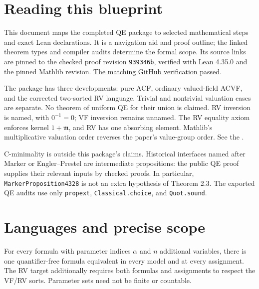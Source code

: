 \section{Reading this blueprint}
This document maps the completed QE package to selected mathematical steps
and exact Lean declarations. It is a navigation aid and proof outline;
the linked theorem types and compiler audits determine the formal scope.
Its source links are pinned to the checked proof revision
\texttt{939346b}, verified with Lean 4.35.0 and the pinned Mathlib revision.
\href{https://github.com/daviddhilbert/ACVF-QE/actions/runs/42689540057}{The matching GitHub verification passed}.

The package has three developments: pure ACF, ordinary valued-field ACVF,
and the corrected two-sorted RV language. Trivial and nontrivial valuation
cases are separate. No theorem of uniform QE for their union is claimed.
RV inversion is named, with $0^{-1}=0$; VF inversion remains unnamed.
The RV equality axiom enforces kernel $1+\mathfrak m$, and RV has one
absorbing element. Mathlib's multiplicative valuation order reverses the
paper's value-group order. See the
.

C-minimality is outside this package's claims. Historical interfaces named
after Marker or Engler--Prestel are intermediate propositions: the public
QE proof supplies their relevant inputs by checked proofs. In particular,
\texttt{MarkerProposition4328} is not an extra hypothesis of Theorem 2.3.
The exported QE audits use only \texttt{propext}, \texttt{Classical.choice},
and \texttt{Quot.sound}.


\section{Languages and precise scope}

\begin{definition}

\label{qe-syntax}


\leanok

For every formula with parameter indices $\alpha$ and $n$ additional variables,
there is one quantifier-free formula equivalent in every model and at every
assignment. The RV target additionally requires both formulas and assignments
to respect the VF/RV sorts. Parameter sets need not be finite or countable.

\end{definition}

